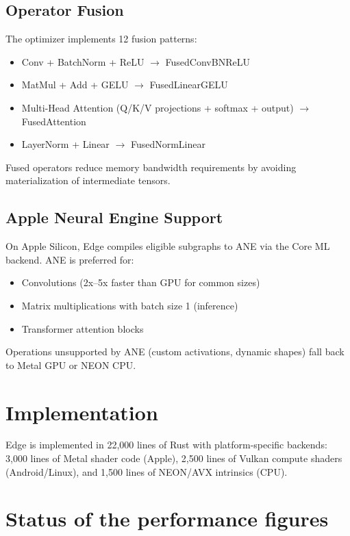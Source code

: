 \documentclass[11pt,twocolumn]{article}
\begin{document}
\subsection{Operator Fusion}

The optimizer implements 12 fusion patterns:

\begin{itemize}
    \item Conv + BatchNorm + ReLU $\rightarrow$ FusedConvBNReLU
    \item MatMul + Add + GELU $\rightarrow$ FusedLinearGELU
    \item Multi-Head Attention (Q/K/V projections + softmax + output) $\rightarrow$ FusedAttention
    \item LayerNorm + Linear $\rightarrow$ FusedNormLinear
\end{itemize}

Fused operators reduce memory bandwidth requirements by avoiding materialization of intermediate tensors.

\subsection{Apple Neural Engine Support}

On Apple Silicon, Edge compiles eligible subgraphs to ANE via the Core ML backend. ANE is preferred for:

\begin{itemize}
    \item Convolutions (2x--5x faster than GPU for common sizes)
    \item Matrix multiplications with batch size 1 (inference)
    \item Transformer attention blocks
\end{itemize}

Operations unsupported by ANE (custom activations, dynamic shapes) fall back to Metal GPU or NEON CPU.

\section{Implementation}

Edge is implemented in 22,000 lines of Rust with platform-specific backends: 3,000 lines of Metal shader code (Apple), 2,500 lines of Vulkan compute shaders (Android/Linux), and 1,500 lines of NEON/AVX intrinsics (CPU).

\section{Status of the performance figures}
\label{sec:figures}
\end{document}
